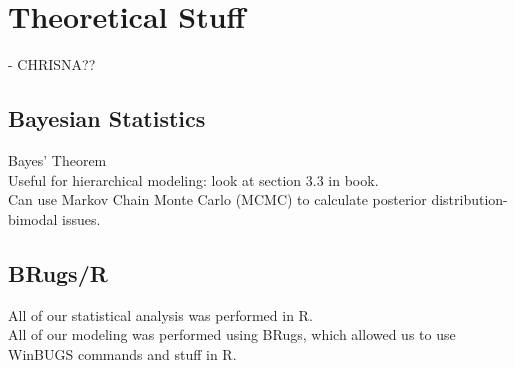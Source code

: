 \documentclass{article}
\begin{document}
\section{Theoretical Stuff} - CHRISNA??
	\subsection{Bayesian Statistics}
	   	Bayes' Theorem \\
    	Useful for hierarchical modeling: look at section 3.3 in book. \\
    	Can use Markov Chain Monte Carlo (MCMC) to calculate posterior 
			distribution- bimodal issues.
	\subsection{BRugs/R}
    	All of our statistical analysis was performed in R.  \\
    	All of our modeling was performed using BRugs, which allowed us to use 
			WinBUGS commands and stuff in R.
\end{document}

